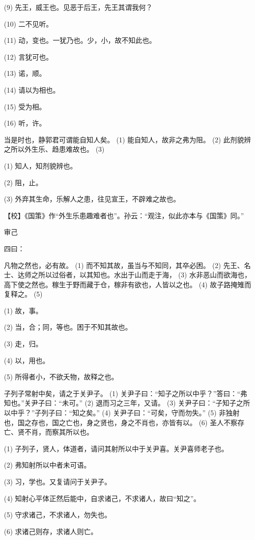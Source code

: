 \documentclass[12pt,UTF8]{ctexbook}
\begin{document}
(9) 先王，威王也。见恶于后王，先王其谓我何？

(10) 二不见听。

(11) 动，变也。一犹乃也。少，小，故不知此也。

(12) 言犹可也。

(13) 诺，顺。

(14) 请以为相也。

(15) 受为相。

(16) 听，许。

当是时也，静郭君可谓能自知人矣。 (1) 能自知人，故非之弗为阻。 (2) 此剂貌辨之所以外生乐、趋患难故也。 (3)

(1) 知人，知剂貌辨也。

(2) 阻，止。

(3) 外弃其生命，乐解人之患，往见宣王，不辟难之故也。

【校】《国策》作“外生乐患趣难者也”。孙云：“观注，似此亦本与《国策》同。”





审己


四曰：

凡物之然也，必有故。 (1) 而不知其故，虽当与不知同，其卒必困。 (2) 先王、名士、达师之所以过俗者，以其知也。水出于山而走于海， (3) 水非恶山而欲海也，高下使之然也。稼生于野而藏于仓，稼非有欲也，人皆以之也。 (4) 故子路掩雉而复释之。 (5)

(1) 故，事。

(2) 当，合；同，等也。困于不知其故也。

(3) 走，归。

(4) 以，用也。

(5) 所得者小，不欲夭物，故释之也。

子列子常射中矣，请之于关尹子。 (1) 关尹子曰：“知子之所以中乎？”答曰：“弗知也。”关尹子曰：“未可。” (2) 退而习之三年，又请。 (3) 关尹子曰：“子知子之所以中乎？”子列子曰：“知之矣。” (4) 关尹子曰：“可矣，守而勿失。” (5) 非独射也，国之存也，国之亡也，身之贤也，身之不肖也，亦皆有以。 (6) 圣人不察存亡、贤不肖，而察其所以也。

(1) 子列子，贤人，体道者，请问其射所以中于关尹喜。关尹喜师老子也。

(2) 弗知射所以中者未可语。

(3) 习，学也。又复请问于关尹子。

(4) 知射心平体正然后能中，自求诸己，不求诸人，故曰“知之”。

(5) 守求诸己，不求诸人，勿失也。

(6) 求诸己则存，求诸人则亡。
\end{document}
